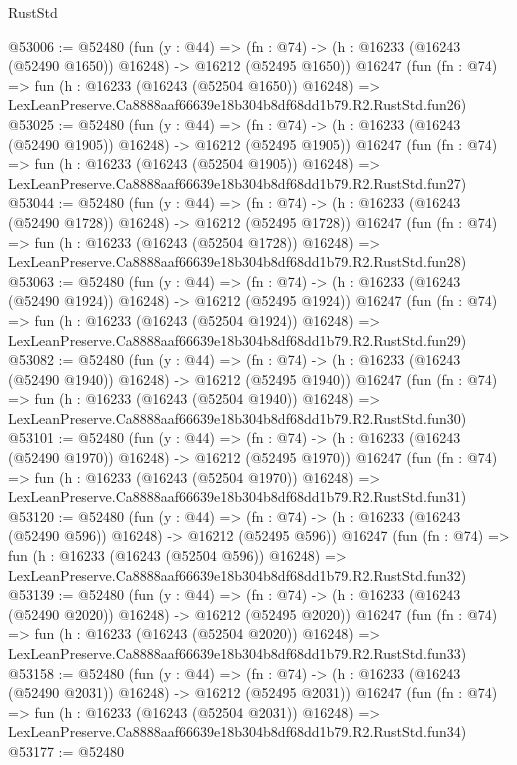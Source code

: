 \begin{lexlean}{RustStd}
\begin{coremodule}
@53006 := @52480
    (fun (y : @44) =>
    (fn : @74) -> (h : @16233 (@16243 (@52490 @1650)) @16248) -> @16212 (@52495 @1650))
    @16247
    (fun (fn : @74) =>
    fun (h : @16233 (@16243 (@52504 @1650)) @16248) =>
    LexLeanPreserve.Ca8888aaf66639e18b304b8df68dd1b79.R2.RustStd.fun26)
@53025 := @52480
    (fun (y : @44) =>
    (fn : @74) -> (h : @16233 (@16243 (@52490 @1905)) @16248) -> @16212 (@52495 @1905))
    @16247
    (fun (fn : @74) =>
    fun (h : @16233 (@16243 (@52504 @1905)) @16248) =>
    LexLeanPreserve.Ca8888aaf66639e18b304b8df68dd1b79.R2.RustStd.fun27)
@53044 := @52480
    (fun (y : @44) =>
    (fn : @74) -> (h : @16233 (@16243 (@52490 @1728)) @16248) -> @16212 (@52495 @1728))
    @16247
    (fun (fn : @74) =>
    fun (h : @16233 (@16243 (@52504 @1728)) @16248) =>
    LexLeanPreserve.Ca8888aaf66639e18b304b8df68dd1b79.R2.RustStd.fun28)
@53063 := @52480
    (fun (y : @44) =>
    (fn : @74) -> (h : @16233 (@16243 (@52490 @1924)) @16248) -> @16212 (@52495 @1924))
    @16247
    (fun (fn : @74) =>
    fun (h : @16233 (@16243 (@52504 @1924)) @16248) =>
    LexLeanPreserve.Ca8888aaf66639e18b304b8df68dd1b79.R2.RustStd.fun29)
@53082 := @52480
    (fun (y : @44) =>
    (fn : @74) -> (h : @16233 (@16243 (@52490 @1940)) @16248) -> @16212 (@52495 @1940))
    @16247
    (fun (fn : @74) =>
    fun (h : @16233 (@16243 (@52504 @1940)) @16248) =>
    LexLeanPreserve.Ca8888aaf66639e18b304b8df68dd1b79.R2.RustStd.fun30)
@53101 := @52480
    (fun (y : @44) =>
    (fn : @74) -> (h : @16233 (@16243 (@52490 @1970)) @16248) -> @16212 (@52495 @1970))
    @16247
    (fun (fn : @74) =>
    fun (h : @16233 (@16243 (@52504 @1970)) @16248) =>
    LexLeanPreserve.Ca8888aaf66639e18b304b8df68dd1b79.R2.RustStd.fun31)
@53120 := @52480
    (fun (y : @44) =>
    (fn : @74) -> (h : @16233 (@16243 (@52490 @596)) @16248) -> @16212 (@52495 @596))
    @16247
    (fun (fn : @74) =>
    fun (h : @16233 (@16243 (@52504 @596)) @16248) =>
    LexLeanPreserve.Ca8888aaf66639e18b304b8df68dd1b79.R2.RustStd.fun32)
@53139 := @52480
    (fun (y : @44) =>
    (fn : @74) -> (h : @16233 (@16243 (@52490 @2020)) @16248) -> @16212 (@52495 @2020))
    @16247
    (fun (fn : @74) =>
    fun (h : @16233 (@16243 (@52504 @2020)) @16248) =>
    LexLeanPreserve.Ca8888aaf66639e18b304b8df68dd1b79.R2.RustStd.fun33)
@53158 := @52480
    (fun (y : @44) =>
    (fn : @74) -> (h : @16233 (@16243 (@52490 @2031)) @16248) -> @16212 (@52495 @2031))
    @16247
    (fun (fn : @74) =>
    fun (h : @16233 (@16243 (@52504 @2031)) @16248) =>
    LexLeanPreserve.Ca8888aaf66639e18b304b8df68dd1b79.R2.RustStd.fun34)
@53177 := @52480

\end{coremodule}
\end{lexlean}
